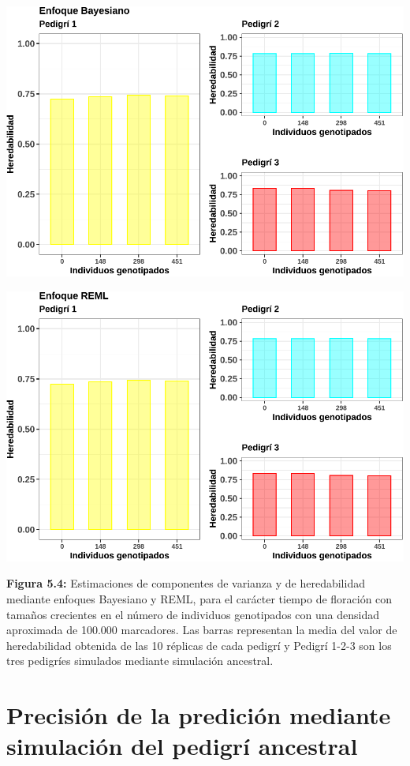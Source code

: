 \documentclass[11pt,spanish,a4paper,oneside,]{book} %
\begin{document}
\begin{center}\includegraphics[width=0.94\linewidth]{figures/param_Bayes_2} \end{center}

\begin{center}\includegraphics[width=0.94\linewidth]{figures/param_reml_2} \end{center}

\noindent
\textbf{Figura 5.4:} Estimaciones de componentes de varianza y de heredabilidad mediante enfoques Bayesiano y REML, para el carácter tiempo de floración con tamaños crecientes en el número de individuos genotipados con una densidad aproximada de 100.000 marcadores. Las barras representan la media del valor de heredabilidad obtenida de las 10 réplicas de cada pedigrí y Pedigrí 1-2-3 son los tres pedigríes simulados mediante simulación ancestral.

\hypertarget{precisiuxf3n-de-la-prediciuxf3n-mediante-simulaciuxf3n-del-pedigruxed-ancestral-1}{%
\section{Precisión de la predición mediante simulación del pedigrí ancestral}\label{precisiuxf3n-de-la-prediciuxf3n-mediante-simulaciuxf3n-del-pedigruxed-ancestral-1}}
\end{document}

